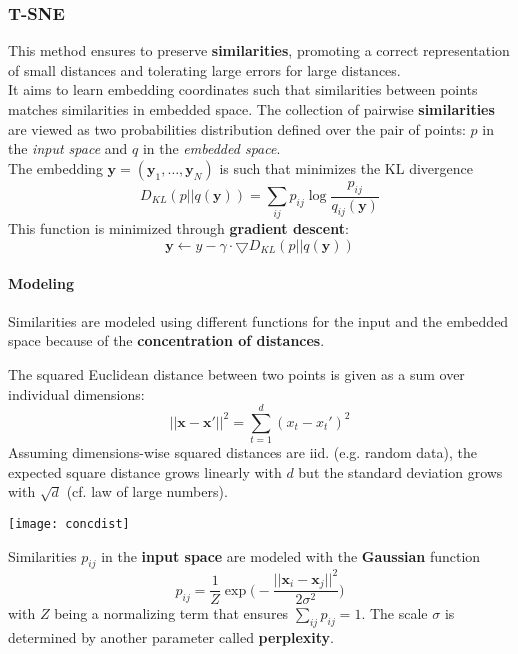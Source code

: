 \subsubsection{T-SNE}
This method ensures to preserve \textbf{similarities}, promoting a correct representation of small distances and tolerating large errors for large distances.\\
It aims to learn embedding coordinates such that similarities between points matches similarities in embedded space. The collection of pairwise \textbf{similarities} are viewed as two probabilities distribution defined over the pair of points: $p$ in the \textit{input space} and $q$ in the \textit{embedded space}.\\
The embedding $\mathbf{y} = (\mathbf{y}_1, \ldots, \mathbf{y}_N)$ is such that minimizes the KL divergence
\begin{equation}
	D_{KL}(p \vert\vert q(\mathbf{y})) = \sum_{ij} p_{ij} \log\frac{p_{ij}}{q_{ij}(\mathbf{y})}
\end{equation}
This function is minimized through \textbf{gradient descent}:
\begin{equation*}
	\mathbf{y} \longleftarrow y - \gamma \cdot \bigtriangledown D_{KL}(p \vert\vert q(\mathbf{y}))
\end{equation*}

\paragraph{Modeling} Similarities are modeled using different functions for the input and the embedded space because of the \textbf{concentration of distances}.

\begin{definition}
	The squared Euclidean distance between two points is given as a sum over individual dimensions:
	\begin{equation}
		\lvert\lvert \mathbf{x} - \mathbf{x}' \rvert\rvert ^ 2 = \sum_{t=1}^{d} (x_t - x_t')^2
	\end{equation}
	Assuming dimensions-wise squared distances are iid. (e.g. random data), the expected square distance grows linearly with $d$ but the standard deviation grows with $\sqrt{d}$ (cf. law of large numbers).
	\begin{center}
		\texttt{[image: concdist]}
	\end{center}
\end{definition}
\newpage
Similarities $p_{ij}$ in the \textbf{input space} are modeled with the \textbf{Gaussian} function
\begin{equation}
	p_{ij} = \frac{1}{Z} \exp\big(- \frac{\lvert\lvert \mathbf{x}_i - \mathbf{x}_j \rvert\rvert^2}{2 \sigma^2}\big)
\end{equation}
with $Z$ being a normalizing term that ensures $\sum_{ij} p_{ij}=1$. The scale $\sigma$ is determined by another parameter called \textbf{perplexity}.

